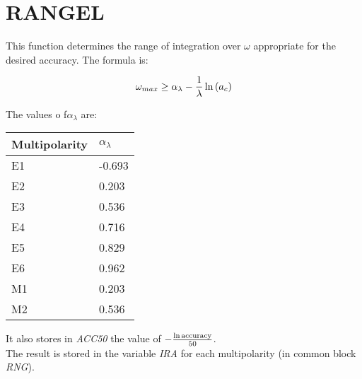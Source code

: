 \section{RANGEL}
\label{sect:rangel}

\noindent This function determines the range of integration over $\omega$
appropriate for the desired accuracy. The formula is:

\begin{equation}
\omega_{max} \ge \alpha_\lambda - {1 \over \lambda} \ln{(a_c)}
\end{equation}

\noindent The values o f$\alpha_\lambda$ are:\\

\begin{center}
\begin{tabular}{|ll|}
\hline
Multipolarity & $\alpha_\lambda$\\
\hline
E1 & -0.693\\
E2 & 0.203\\
E3 & 0.536\\
E4 & 0.716\\
E5 & 0.829\\
E6 & 0.962\\
M1 & 0.203\\
M2 & 0.536\\
\hline
\end{tabular}
\end{center}

\noindent It also stores in {\em ACC50} the value of $-{\ln\mathrm{accuracy}
\over 50}$.\\

\noindent The result is stored in the variable {\em IRA} for each
multipolarity (in common block {\em RNG}).\\

